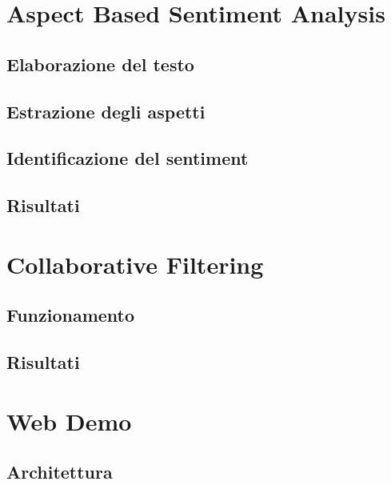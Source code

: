 \documentclass[hidelinks, 12pt]{article}
\begin{document}
\clearpage



\section{Aspect Based Sentiment Analysis}

\subsection{Elaborazione del testo}

\subsection{Estrazione degli aspetti}

\subsection{Identificazione del sentiment}

\subsection{Risultati}



\clearpage



\section{Collaborative Filtering}

\subsection{Funzionamento}

\subsection{Risultati}



\clearpage



\section{Web Demo}
\label{sec:ui}


\subsection{Architettura}
\end{document}
